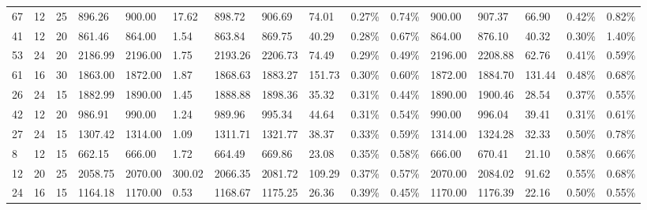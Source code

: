 \begin{longtable}{l|ll|lll|lllll|lllll}
   67 & 12                         & 25                         & 896.26                    & 900.00      & 17.62               & 898.72  & 906.69  & 74.01  & 0.27\%  & 0.74\% & 900.00  & 907.37  & 66.90  & 0.42\%  & 0.82\% \\
   41 & 12                         & 20                         & 861.46                    & 864.00      & 1.54                & 863.84  & 869.75  & 40.29  & 0.28\%  & 0.67\% & 864.00  & 876.10  & 40.32  & 0.30\%  & 1.40\% \\
   53 & 24                         & 20                         & 2186.99                   & 2196.00     & 1.75                & 2193.26 & 2206.73 & 74.49  & 0.29\%  & 0.49\% & 2196.00 & 2208.88 & 62.76  & 0.41\%  & 0.59\% \\
   61 & 16                         & 30                         & 1863.00                   & 1872.00     & 1.87                & 1868.63 & 1883.27 & 151.73 & 0.30\%  & 0.60\% & 1872.00 & 1884.70 & 131.44 & 0.48\%  & 0.68\% \\
   26 & 24                         & 15                         & 1882.99                   & 1890.00     & 1.45                & 1888.88 & 1898.36 & 35.32  & 0.31\%  & 0.44\% & 1890.00 & 1900.46 & 28.54  & 0.37\%  & 0.55\% \\
   42 & 12                         & 20                         & 986.91                    & 990.00      & 1.24                & 989.96  & 995.34  & 44.64  & 0.31\%  & 0.54\% & 990.00  & 996.04  & 39.41  & 0.31\%  & 0.61\% \\
   27 & 24                         & 15                         & 1307.42                   & 1314.00     & 1.09                & 1311.71 & 1321.77 & 38.37  & 0.33\%  & 0.59\% & 1314.00 & 1324.28 & 32.33  & 0.50\%  & 0.78\% \\
   8  & 12                         & 15                         & 662.15                    & 666.00      & 1.72                & 664.49  & 669.86  & 23.08  & 0.35\%  & 0.58\% & 666.00  & 670.41  & 21.10  & 0.58\%  & 0.66\% \\
   12 & 20                         & 25                         & 2058.75                   & 2070.00     & 300.02              & 2066.35 & 2081.72 & 109.29 & 0.37\%  & 0.57\% & 2070.00 & 2084.02 & 91.62  & 0.55\%  & 0.68\% \\
   24 & 16                         & 15                         & 1164.18                   & 1170.00     & 0.53                & 1168.67 & 1175.25 & 26.36  & 0.39\%  & 0.45\% & 1170.00 & 1176.39 & 22.16  & 0.50\%  & 0.55\% \\

\end{longtable}
